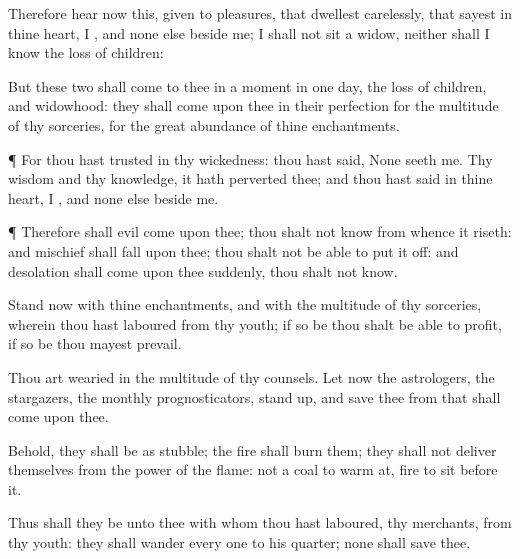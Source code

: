 {Therefore
hear now this,
{} given to
pleasures, that
dwellest
carelessly, that
sayest in thine
heart, I
{}, and none
else beside me; I shall not
sit
{} a
widow, neither shall I
know the loss of
children:

But these
two
{} shall
come to thee in a
moment in
one
day, the loss of
children, and
widowhood: they shall
come upon thee in their
perfection for the
multitude of thy
sorceries,
{} for the
great
abundance of thine
enchantments.


\par }{\PP {}¶ For thou hast
trusted in thy
wickedness: thou hast
said, None
seeth me. Thy
wisdom and thy
knowledge, it hath
perverted thee; and thou hast
said in thine
heart, I
{}, and none
else beside me.


\par }{\PP {}¶ Therefore shall
evil
come upon thee; thou shalt not
know from whence it
riseth: and
mischief shall
fall upon thee; thou shalt not be
able to put it
off: and
desolation shall
come upon thee
suddenly,
{} thou shalt not
know.

Stand now with thine
enchantments, and with the
multitude of thy
sorceries,
wherein thou hast
laboured from thy
youth; if so be thou shalt be
able to
profit, if so be thou mayest
prevail.

Thou art
wearied in the
multitude of thy
counsels. Let now the
astrologers, the
stargazers, the
monthly
prognosticators, stand
up, and
save thee from
{} that shall
come upon thee.

Behold, they shall be as
stubble; the
fire shall
burn them; they shall not
deliver
themselves from the
power of the
flame:
{} not
{} a
coal to
warm at,
{}
fire to
sit before it.

Thus shall they be unto thee with whom thou hast
laboured,
{} thy
merchants, from thy
youth: they shall
wander every
one to his
quarter; none shall
save thee.




}
